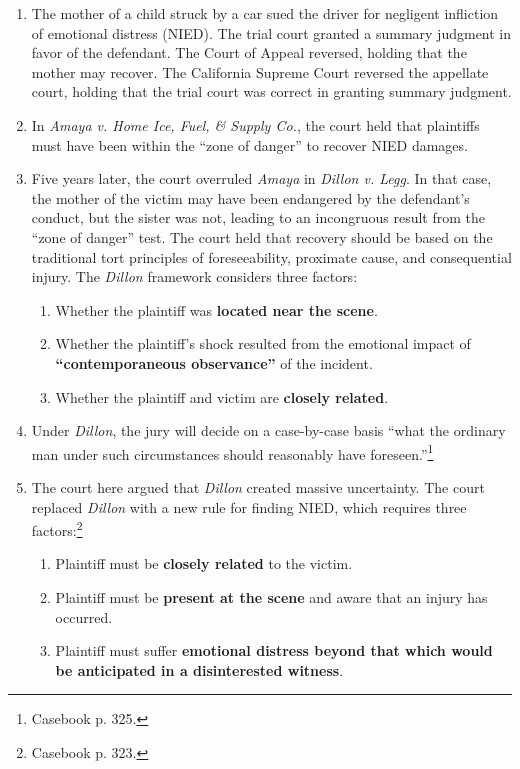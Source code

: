 \begin{enumerate}
    \item The mother of a child struck by a car sued the driver for negligent infliction of emotional distress (NIED). The trial court granted a summary judgment in favor of the defendant. The Court of Appeal reversed, holding that the mother may recover. The California Supreme Court reversed the appellate court, holding that the trial court was correct in granting summary judgment.
    \item In \emph{Amaya v. Home Ice, Fuel, \& Supply Co.}, the court held that plaintiffs must have been within the ``zone of danger'' to recover NIED damages.
    \item Five years later, the court overruled \emph{Amaya} in \emph{Dillon v. Legg}. In that case, the mother of the victim may have been endangered by the defendant's conduct, but the sister was not, leading to an incongruous result from the ``zone of danger'' test. The court held that recovery should be based on the traditional tort principles of foreseeability, proximate cause, and consequential injury. The \emph{Dillon} framework considers three factors:
    \begin{enumerate}
        \item Whether the plaintiff was \textbf{located near the scene}.
        \item Whether the plaintiff's shock resulted from the emotional impact of \textbf{``contemporaneous observance''} of the incident.
        \item Whether the plaintiff and victim are \textbf{closely related}.
    \end{enumerate}
    \item Under \emph{Dillon}, the jury will decide on a case-by-case basis ``what the ordinary man under such circumstances should reasonably have foreseen.''\footnote{Casebook p. 325.}
    \item The court here argued that \emph{Dillon} created massive uncertainty. The court replaced \emph{Dillon} with a new rule for finding NIED, which requires three factors:\footnote{Casebook p. 323.}
    \begin{enumerate}
        \item Plaintiff must be \textbf{closely related} to the victim.
        \item Plaintiff must be \textbf{present at the scene} and aware that an injury has occurred.
        \item Plaintiff must suffer \textbf{emotional distress beyond that which would be anticipated in a disinterested witness}.

\end{enumerate}
\end{enumerate}
